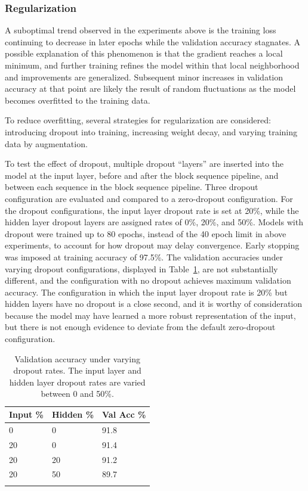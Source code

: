 \documentclass[letterpaper]{article} %
\begin{document}
\subsubsection{Regularization}

A suboptimal trend observed in the experiments above is the training loss continuing to decrease in later
epochs while the validation accuracy stagnates.
A possible explanation of this phenomenon is that the gradient reaches a local minimum, and further training
refines the model within that local neighborhood and improvements are generalized.
Subsequent minor increases in validation accuracy at that point are likely the result of random fluctuations as the
model becomes overfitted to the training data.

To reduce overfitting, several strategies for regularization are considered:
introducing dropout into training, increasing weight decay, and varying training data by augmentation.

To test the effect of dropout, multiple dropout ``layers'' are inserted into the model at the input layer,
before and after the block sequence pipeline, and between each sequence in the block sequence pipeline.
Three dropout configuration are evaluated and compared to a zero-dropout configuration.
For the dropout configurations, the input layer dropout rate is set at 20\%, while the hidden layer
dropout layers are assigned rates of 0\%, 20\%, and 50\%.
Models with dropout were trained up to 80 epochs, instead of the 40 epoch limit in above experiments,
to account for how dropout may delay convergence.
Early stopping was imposed at training accuracy of 97.5\%.
The validation accuracies under varying dropout configurations, displayed in Table~\ref{table3},
are not substantially different, and the configuration with no dropout achieves maximum validation accuracy.
The configuration in which the input layer dropout rate is 20\% but hidden layers have no dropout
is a close second, and it is worthy of consideration because the model may have learned a more robust
representation of the input, but there is not enough evidence to deviate from the default zero-dropout
configuration.

\begin{table}[b]
\centering
\begin{tabular}{|l|l|l|}
    \firsthline
    Input \% & Hidden \% & Val Acc \%    \\
    \hline
    0 & 0 & 91.8    \\
    20 & 0 & 91.4    \\
    20 & 20 & 91.2    \\
    20 & 50 & 89.7    \\
    \lasthline
\end{tabular}
\caption{Validation accuracy under varying dropout rates. The input layer and hidden layer dropout rates are varied between 0 and 50\%.}
\label{table3}
\end{table}
\end{document}
